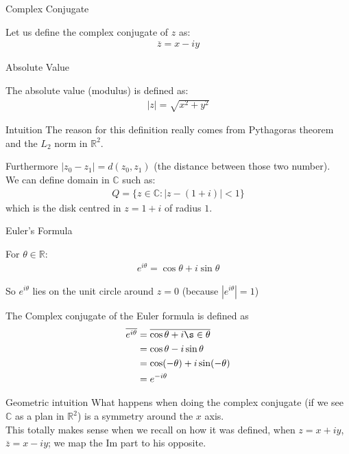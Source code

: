 \begin{parag}{Complex Conjugate}
    \begin{definition}
    Let us define the complex conjugate of $z$ as:
	\begin{align*} \overline{z} = x - iy  \end{align*}
    \end{definition}
\end{parag}
\begin{parag}{Absolute Value}
    \begin{definition}
    The absolute value (modulus) is defined as:
	\begin{align*} | z | = \sqrt{x^2 + y^2} \end{align*}
    \end{definition}
	\begin{subparag}{Intuition}
	    The reason for this definition really comes from Pythagoras theorem and the $L_2$ norm in $\mathbb{R}^2$.
	\end{subparag}
	Furthermore $| z_0 - z_1| = d\left(z_0, z_1\right)$ (the distance between those two number).\\
	We can define domain in $\mathbb{C}$ such as:
	\begin{align*} Q = \{z \in \mathbb{C}: |z - \left(1 + i\right)| < 1\} \end{align*}
	which is the disk centred in $z = 1 + i$ of radius $1$.
\end{parag}

\begin{parag}{Euler's Formula}
    \begin{definition}
    For $\theta \in \mathbb{R}$:
	\begin{align*} e^{i\theta} = \cos \theta + i \sin \theta  \end{align*}
    \end{definition}
	So $e^{i\theta}$ lies on the unit circle around $z = 0$ (because $|e^{i\theta}| = 1$)
	\begin{definition}
	The Complex conjugate of the Euler formula is defined as
	\begin{align*} \overline{e^{i\theta}} &= \overline{\cos \theta + i\s\in\theta} \\
		&= \cos \theta - i \sin \theta\\
		&= \cos(-\theta) + i \sin\left(-\theta\right)\\
		&= e^{-i\theta}
	\end{align*}
	\end{definition}
	\begin{subparag}{Geometric intuition}
	    What happens when doing the complex conjugate (if we see $\mathbb{C}$ as a plan in $ \mathbb{R}^2$) is a symmetry around the $x$ axis. \\
		This totally makes sense when we recall on how it was defined, when $z =  x + iy$, $\overline{z} = x - iy$; we map the $\text{Im}$ part to his opposite.
	\end{subparag}
\end{parag}





